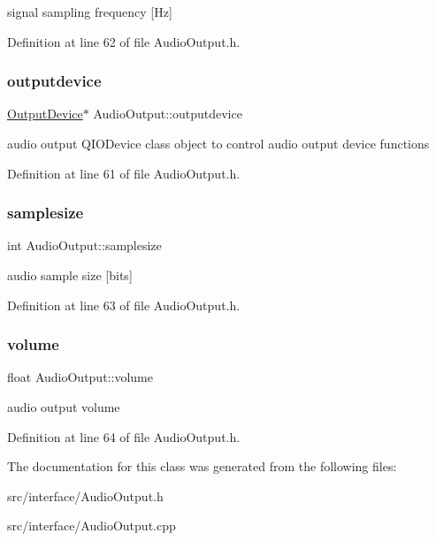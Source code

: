 signal sampling frequency \mbox{[}Hz\mbox{]} 

Definition at line 62 of file Audio\+Output.\+h.

\mbox{\label{class_audio_output_aa3e000199604f972e59242fb15a6707e}} 
\subsubsection{\texorpdfstring{outputdevice}{outputdevice}}
{\footnotesize\ttfamily \hyperlink{class_output_device}{Output\+Device}$\ast$ Audio\+Output\+::outputdevice}

audio output Q\+I\+O\+Device class object to control audio output device functions 

Definition at line 61 of file Audio\+Output.\+h.

\mbox{\label{class_audio_output_aac9c297a839bb25c1232fc5adcce6cab}} 
\subsubsection{\texorpdfstring{samplesize}{samplesize}}
{\footnotesize\ttfamily int Audio\+Output\+::samplesize}

audio sample size \mbox{[}bits\mbox{]} 

Definition at line 63 of file Audio\+Output.\+h.

\mbox{\label{class_audio_output_a16937c9086904959b06b77326032aa72}} 
\subsubsection{\texorpdfstring{volume}{volume}}
{\footnotesize\ttfamily float Audio\+Output\+::volume}

audio output volume 

Definition at line 64 of file Audio\+Output.\+h.



The documentation for this class was generated from the following files\+:\begin{DoxyCompactItemize}
\item 
src/interface/Audio\+Output.\+h\item 
src/interface/Audio\+Output.\+cpp\end{DoxyCompactItemize}
